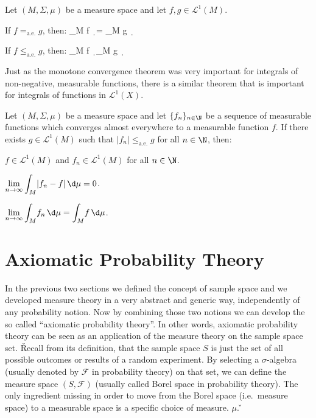 \bt[]
Let $(M,\Sigma,\mu)$ be a measure space and let $f,g \in \mathscr{L}^1(M)$.
\ben[label=(\roman*)]
\item If $f=_{\mathrm{a.e.}}g$, then:
\bse
\displaystyle \int_M\! f \, \d \mu = \int_M\! g \, \d \mu
\ese

\item If $f\leq_{\mathrm{a.e.}}g$, then:
\bse
\displaystyle \int_M\! f \, \d \mu \leq \int_M\! g \, \d \mu
\ese
\een
\et

Just as the monotone convergence theorem was very important for integrals of non-negative, measurable functions,
there is a similar theorem that is important for integrals of functions in $\mathscr{L}^1(X)$.

Let $(M,\Sigma,\mu)$ be a measure space and let $\{f_n\}_{n\in\N}$ be a sequence of measurable functions which
converges almost everywhere to a measurable function $f$. If there exists $g \in \mathscr{L}^1(M)$ such that $|f_n|
\leq_{\mathrm{a.e.}} g$ for all $n \in \N$, then:
\ben[label=(\roman*)]
\item $f \in \mathscr{L}^1(M)$ and $f_n \in \mathscr{L}^1(M)$ for all $n \in \N$.
\item $\displaystyle \lim_{n \to \infty} \int_M \! |f_n-f| \, \d \mu =0$.
\item $\displaystyle \lim_{n \to \infty} \int_M \! f_n \, \d \mu = \int_M \! f \, \d \mu$.
\een
\et

\section{Axiomatic Probability Theory}

In the previous two sections we defined the concept of sample space and we developed measure theory in a very
abstract and generic way, independently of any probability notion. Now by combining those two notions we can develop
the so called ``axiomatic probability theory''. In other words, axiomatic probability theory can be seen as an
application of the measure theory on the sample space set. \v

Recall from its definition, that the sample space $S$ is just the set of all possible outcomes or results of a random
experiment. By selecting a $\sigma$-algebra (usually denoted by $\mathcal{F}$ in probability theory) on that set, we
can define the measure space $(S, \mathcal{F})$ (usually called Borel space in probability theory). The only
ingredient missing in order to move from the Borel space (i.e.\ measure space) to a measurable space is a specific
choice of measure. $\mu$. \v

